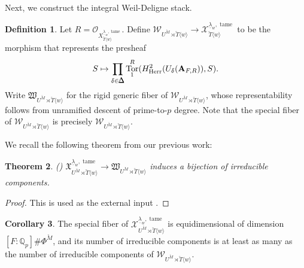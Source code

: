\documentclass[11pt]{amsart}
\newtheorem{thm}{Theorem}[section]
\theoremstyle{definition}
\newtheorem{cor}[thm]{Corollary}
\newtheorem{defn}[thm]{Definition}
\newcommand{\doublestroke}[1]{\pdfliteral{1 Tr .3 w}#1\pdfliteral{0 Tr 0 w}}
\newcommand{\Bdelta}{\doublestroke{\delta}}
\newcommand{\BDelta}{%
    \scalebox{.8}{$\Delta$}%
    \llap{%
            \scalebox{.9}{$\Delta$}%
    }%
}
\newcommand{\Q}{\mathbb{Q}}
\newcommand{\bfA}{\mathbf{A}}
\newcommand{\cO}{\mathcal{O}}
\newcommand{\cX}{\mathcal{X}}
\newcommand{\fX}{\mathfrak{X}}
\newcommand{\cW}{\mathcal{W}}
\newcommand{\sW}{\mathscr{W}}
\newcommand{\fW}{\mathfrak{W}}
\newcommand{\bM}{\breve{M}}
\newcommand{\bT}{\breve{T}}
\DeclareMathOperator{\Tor}{Tor}
\DeclareMathOperator{\tame}{tame}
\newcommand{\Herr}{\mathrm{Herr}}
\begin{document}
Next, we construct the integral
Weil-Deligne stack.

\begin{defn}
Let $R=\cO_{X_{\bT \langle w\rangle}^{\underline{\lambda}_w, \tame}}$.
Define
$\sW_{U^{\bM}\rtimes \bT \langle w\rangle}
\to \cX_{\bT\langle w\rangle}^{\underline{\lambda}_w, \tame}$
to be the morphism
that represents the presheaf
\[
S\mapsto \prod_{\Bdelta\in \BDelta}
\Tor^R_1(H_{\Herr}^2(U_{\Bdelta}(\bfA_{F,R})),S).
\]
Write
$\fW_{U^{\bM}\rtimes \bT \langle w\rangle}$
for the rigid generic fiber of
$\sW_{U^{\bM}\rtimes \bT \langle w\rangle}$,
whose representability follows from unramified descent
of prime-to-$p$ degree.
Note that the special fiber of
$\sW_{U^{\bM}\rtimes \bT \langle w\rangle}$
is precisely
$\cW_{U^{\bM}\rtimes \bT \langle w\rangle}$.
\end{defn}


We recall the following theorem from our previous work:

\begin{thm} (\cite[Theorem 3]{Lin25})
\rm
$
\fX_{U^{\bM}\rtimes \bT \langle w\rangle}
^{\underline{\lambda}_w, \tame}
\to
\fW_{U^{\bM}\rtimes \bT \langle w\rangle}
$
induces a bijection of irreducible components.
\label{thm:rigid}
\end{thm}

\begin{proof}
This is used as the external input \cite[Theorem 3]{Lin25}.
\end{proof}

\begin{cor}
The special fiber of 
$
\cX_{U^{\bM}\rtimes \bT \langle w\rangle}
^{\underline{\lambda}_w, \tame}$
is equidimensional of dimension
$[F:\Q_p]\#\Phi^{\bM}$,
and its number of irreducible components
is at least as many as the number of
irreducible components of
$\cW_{U^{\bM}\rtimes \bT \langle w\rangle}$.
\label{cor:Ch-lower-bd}
\end{cor}
\end{document}
